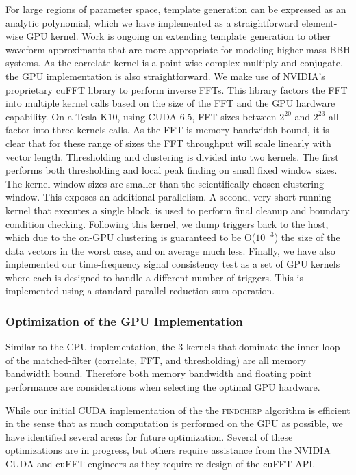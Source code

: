 For large regions of parameter space, template generation can be expressed as
an analytic polynomial, which we have implemented as a straightforward
element-wise GPU kernel. Work is ongoing on extending template generation to
other waveform approximants that are more appropriate for modeling higher mass
BBH systems. As the correlate kernel is a point-wise complex multiply and
conjugate, the GPU implementation is also straightforward.  We make use of
NVIDIA's proprietary cuFFT library to perform inverse FFTs.  This library
factors the FFT into multiple kernel calls based on the size of the FFT and
the GPU hardware capability. On a Tesla K10, using CUDA 6.5, FFT sizes between
$2^{20}$ and $2^{23}$ all factor into three kernels calls. As the FFT is
memory bandwidth bound, it is clear that for these range of sizes the FFT
throughput will scale linearly with vector length.  Thresholding and
clustering is divided into two kernels. The first performs both thresholding
and local peak finding on small fixed window sizes. The kernel window sizes
are smaller than the scientifically chosen clustering window. This exposes an
additional parallelism. A second, very short-running kernel that executes a
single block, is used to perform final cleanup and boundary condition
checking. Following this kernel, we dump triggers back to the host, which due
to the on-GPU clustering is guaranteed to be O($10^{-3}$) the size of the data
vectors in the worst case, and on average much less.  Finally, we have also
implemented our time-frequency signal consistency test as a set of GPU kernels
where each is designed to handle a different number of triggers. This is
implemented using a standard parallel reduction sum operation. 

\vspace*{-10pt}
\subsubsection{Optimization of the GPU Implementation}
\vspace*{-05pt}

Similar to the CPU implementation, the 3 kernels that dominate the inner loop
of the matched-filter (correlate, FFT, and thresholding) are all memory
bandwidth bound. Therefore both memory bandwidth and floating point performance
are considerations when selecting the optimal GPU hardware.

While our initial CUDA implementation of the the \textsc{findchirp} algorithm
is efficient in the sense that as much computation is performed on the GPU as
possible, we have identified several areas for future optimization. Several of
these optimizations are in progress, but others require assistance from the
NVIDIA CUDA and cuFFT engineers as they require re-design of the cuFFT API.  

